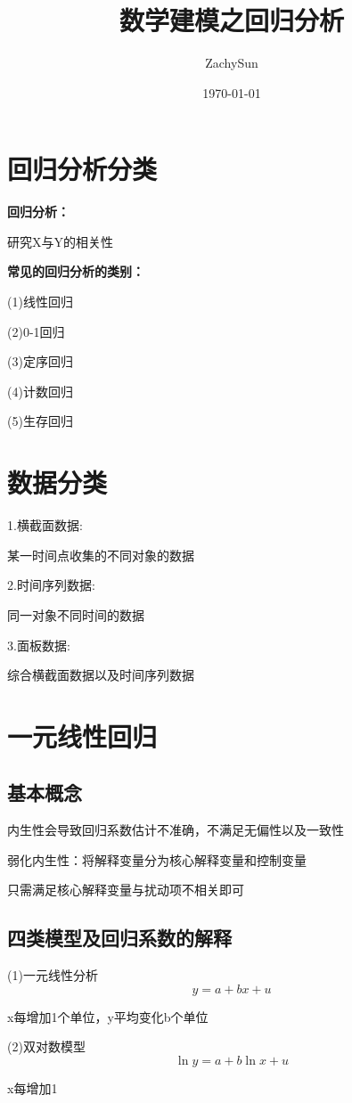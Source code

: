 \documentclass{article}
\title{数学建模之回归分析}
\date{\today}
\author{ZachySun}
\begin{document}
\maketitle

\section{回归分析分类}
\textbf{回归分析：}

研究X与Y的相关性

\textbf{常见的回归分析的类别：}

(1)线性回归

(2)0-1回归

(3)定序回归

(4)计数回归

(5)生存回归

\section{数据分类}
1.横截面数据:

某一时间点收集的不同对象的数据

2.时间序列数据:

同一对象不同时间的数据

3.面板数据:

综合横截面数据以及时间序列数据

\section{一元线性回归}

\subsection{基本概念}

内生性会导致回归系数估计不准确，不满足无偏性以及一致性

弱化内生性：将解释变量分为核心解释变量和控制变量

只需满足核心解释变量与扰动项不相关即可

\subsection{四类模型及回归系数的解释}
(1)一元线性分析
$$
y=a+bx+u
$$

x每增加1个单位，y平均变化b个单位

(2)双对数模型
$$
\ln y=a+b\ln x+u
$$

x每增加1%
\end{document}

